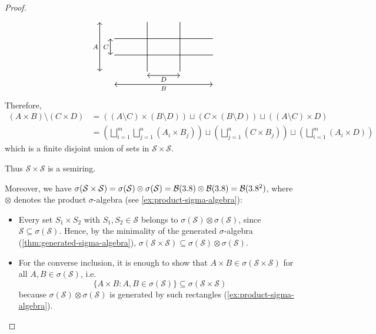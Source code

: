 \begin{proof}
\begin{itemize}
\[\begin{tikzpicture}[scale=0.7, line cap=round, line join=round, font=\footnotesize]
\draw[semithick] (\xone,\yMin) -- (\xone,\yMax);
\draw[semithick] (\xtwo,\yMin) -- (\xtwo,\yMax);
\draw[semithick] (\xMin,\yone) -- (\xMax,\yone);
\draw[semithick] (\xMin,\ytwo) -- (\xMax,\ytwo);

\draw[<->, semithick] (-0.9,\yMin) -- node[left, outer sep=2pt, inner sep=0pt] {$A$} (-0.9,\yMax);
\draw[<->, semithick] (\xMin,-0.8) -- node[below, outer sep=2pt, inner sep=0pt] {$B$} (\xMax,-0.8);

\draw[<->, semithick] (-0.25,\yone) -- node[left, outer sep=2pt, inner sep=0pt] {$C$} (-0.25,\ytwo);
\draw[<->, semithick] (\xone,-0.25) -- node[below, outer sep=2pt, inner sep=0pt] {$D$} (\xtwo,-0.25);

\end{tikzpicture}
\]
Therefore,
\[
\begin{aligned}
(A \times B) \setminus (C \times D)
&=
\left((A \setminus C) \times (B \setminus D)\right)
\sqcup
\left(C \times (B \setminus D)\right)
\sqcup
\left((A \setminus C) \times D\right)
\\
&=
\left(\bigsqcup_{i=1}^m \bigsqcup_{j=1}^n (A_i \times B_j)\right)
\sqcup
\left(\bigsqcup_{j=1}^n (C \times B_j)\right)
\sqcup
\left(\bigsqcup_{i=1}^m (A_i \times D)\right)
\end{aligned}
\]
which is a finite disjoint union of sets in $\mathcal{S} \times \mathcal{S}$. \cmark
\end{itemize}
Thus $\mathcal{S} \times \mathcal{S}$ is a semiring.

Moreover, we have $\sigma(\mathcal{S} \times \mathcal{S}) = \sigma(\mathcal{S}) \otimes \sigma(\mathcal{S}) = \mathcal{B}(3.8) \otimes \mathcal{B}(3.8) = \mathcal{B}(3.8^2)$, where $\otimes$ denotes the product $\sigma$-algebra (see \autoref{ex:product-sigma-algebra}):
\begin{itemize}[]
\item[\(\subseteq\):]
Every set \(S_1 \times S_2\) with \(S_1,S_2 \in \mathcal{S}\) belongs to
\(\sigma(\mathcal{S}) \otimes \sigma(\mathcal{S})\), since
\(\mathcal{S} \subseteq \sigma(\mathcal{S})\).
Hence, by the minimality of the generated \(\sigma\)-algebra
(\autoref{thm:generated-sigma-algebra}),
\(
\sigma(\mathcal{S} \times \mathcal{S})
\subseteq
\sigma(\mathcal{S}) \otimes \sigma(\mathcal{S})
\).

\item[\(\supseteq\):]
For the converse inclusion, it is enough to show that
\(A \times B \in \sigma(\mathcal{S} \times \mathcal{S})\) for all
\(A,B \in \allowbreak \sigma(\mathcal{S})\), 
i.e. 
\[
\{A \times B : A,B \in \sigma(\mathcal{S})\} \subseteq \sigma(\mathcal{S} \times \mathcal{S})
\]
because
\(\sigma(\mathcal{S}) \otimes \sigma(\mathcal{S})\) is generated by such rectangles
(\autoref{ex:product-sigma-algebra}).


\end{itemize}
\end{proof}
